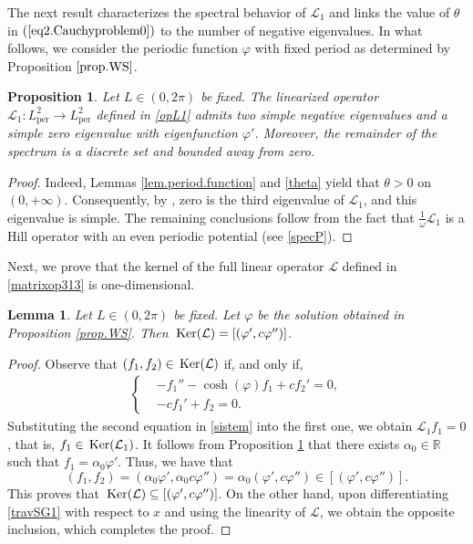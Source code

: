 \documentclass[12pt,reqno,a4paper]{amsart} %
\newtheorem{lema}{Lemma}[section]
\newtheorem{prop}{Proposition}[section]
\newcommand{\Ker}{{\rm \,Ker}}
\numberwithin{equation}{section}
\numberwithin{figure}{section}
\begin{document}
 	The next result characterizes the spectral behavior of $\mathcal{L}_1$ and links the value of $\theta$ in $(\ref{eq2.Cauchyproblem0})$ to the number of negative eigenvalues. In what follows, we consider the periodic function $\varphi$ with fixed period as determined by Proposition $\ref{prop.WS}$. 
 	
 	\begin{prop}\label{eigenvalues.L1} Let $L\in (0,2\pi)$ be fixed. The linearized operator $ \mathcal{L}_1 : L^2_{\mathrm{per}} \to L^2_{\mathrm{per}}$ defined in \eqref{opL1} admits two simple negative eigenvalues and a simple zero eigenvalue with eigenfunction $\varphi'$.  Moreover, the remainder of the spectrum is a discrete set and bounded away from zero. 
 	\end{prop}
 	\begin{proof}
 		Indeed, Lemmas \ref{lem.period.function} and \ref{theta} yield that $\theta > 0$ on $(0,+\infty)$. Consequently, by \cite[Theorem 3.1]{neves}, zero is the third eigenvalue of $\mathcal{L}_1$, and this eigenvalue is simple. The remaining conclusions follow from the fact that $\frac{1}{\omega}\mathcal{L}_1$ is a Hill operator with an even periodic potential (see \eqref{specP}).
 	\end{proof}
 	
 	Next, we prove that the kernel of the full linear operator $\mathcal{L}$ defined in \eqref{matrixop313} is one-dimensional. 
 	\begin{lema}\label{kernel.L}
 		Let $L\in (0,2\pi)$ be fixed. Let $\varphi$ be the solution obtained in Proposition \ref{prop.WS}. Then  $\Ker(\mathcal{L})=[(\varphi', c\varphi'')]$.
 	\end{lema}
 	\begin{proof}
 		Observe that $(f_1,f_2)\in \Ker(\mathcal{L})$ if, and only if, \begin{align}\label{sistem}
 			\begin{cases}
 				&	 -f_1''-\cosh(\varphi)f_1+cf_2'=0, \\& -cf_1'+f_2=0.
 			\end{cases}
 		\end{align}
 		Substituting the second equation in \eqref{sistem} into the first one, we obtain $\mathcal{L}_1 f_1=0$, that is, $f_1\in \Ker(\mathcal{L}_1)$. It follows from Proposition \ref{eigenvalues.L1} that there exists $\alpha_0 \in \mathbb{R}$ such that $f_1=\alpha_0 \varphi'$. Thus, we have that $$(f_1,f_2)=(\alpha_0 \varphi',\alpha_0c \varphi'')=\alpha_0(\varphi',c\varphi'')\in [(\varphi', c\varphi'')].$$ This proves that $\Ker(\mathcal{L}) \subseteq [(\varphi', c\varphi'')]$. On the other hand, upon differentiating \eqref{travSG1} with respect to $x$ and using the linearity of $\mathcal{L}$, we obtain the opposite inclusion, which completes the proof.
 	\end{proof}
 	
\end{document}
